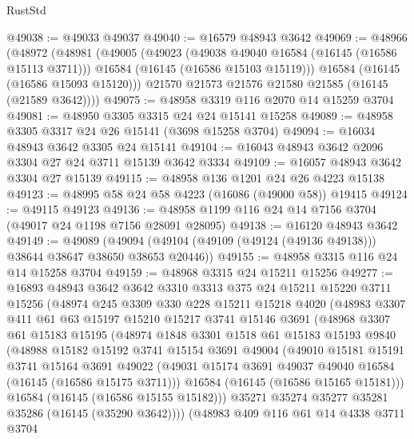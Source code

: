 \begin{lexlean}{RustStd}
\begin{coremodule}
@49038 := @49033 @49037
@49040 := @16579 @48943 @3642
@49069 := @48966
    (@48972
      (@48981
        (@49005
          (@49023
            (@49038 @49040 @16584 (@16145 (@16586 @15113 @3711)))
            @16584
            (@16145 (@16586 @15103 @15119)))
          @16584
          (@16145 (@16586 @15093 @15120)))
        @21570
        @21573
        @21576
        @21580
        @21585
        (@16145 (@21589 @3642))))
@49075 := @48958 @3319 @116 @2070 @14 @15259 @3704
@49081 := @48950 @3305 @3315 @24 @24 @15141 @15258
@49089 := @48958 @3305 @3317 @24 @26 @15141 (@3698 @15258 @3704)
@49094 := @16034 @48943 @3642 @3305 @24 @15141
@49104 := @16043 @48943 @3642 @2096 @3304 @27 @24 @3711 @15139 @3642 @3334
@49109 := @16057 @48943 @3642 @3304 @27 @15139
@49115 := @48958 @136 @1201 @24 @26 @4223 @15138
@49123 := @48995 @58 @24 @58 @4223 (@16086 (@49000 @58)) @19415
@49124 := @49115 @49123
@49136 := @48958 @1199 @116 @24 @14 @7156 @3704 (@49017 @24 @1198 @7156 @28091 @28095)
@49138 := @16120 @48943 @3642
@49149 := @49089
    (@49094 (@49104 (@49109 (@49124 (@49136 @49138))) @38644 @38647 @38650 @38653 @20446))
@49155 := @48958 @3315 @116 @24 @14 @15258 @3704
@49159 := @48968 @3315 @24 @15211 @15256
@49277 := @16893
    @48943
    @3642
    @3642
    @3310
    @3313
    @375
    @24
    @15211
    @15220
    @3711
    @15256
    (@48974
      @245
      @3309
      @330
      @228
      @15211
      @15218
      @4020
      (@48983
        @3307
        @411
        @61
        @63
        @15197
        @15210
        @15217
        @3741
        @15146
        @3691
        (@48968
          @3307
          @61
          @15183
          @15195
          (@48974
            @1848
            @3301
            @1518
            @61
            @15183
            @15193
            @9840
            (@48988
              @15182
              @15192
              @3741
              @15154
              @3691
              @49004
              (@49010
                @15181
                @15191
                @3741
                @15164
                @3691
                @49022
                (@49031 @15174 @3691 @49037 @49040 @16584 (@16145 (@16586 @15175 @3711)))
                @16584
                (@16145 (@16586 @15165 @15181)))
              @16584
              (@16145 (@16586 @15155 @15182)))
            @35271
            @35274
            @35277
            @35281
            @35286
            (@16145 (@35290 @3642))))
        (@48983
          @409
          @116
          @61
          @14
          @4338
          @3711
          @3704

\end{coremodule}
\end{lexlean}
